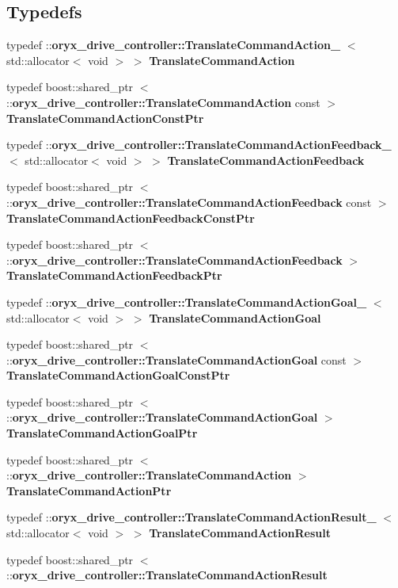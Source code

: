 \subsection*{\-Typedefs}
\begin{DoxyCompactItemize}
\item 
typedef \*
\-::{\bf oryx\-\_\-drive\-\_\-controller\-::\-Translate\-Command\-Action\-\_\-}\*
$<$ std\-::allocator$<$ void $>$ $>$ {\bf \-Translate\-Command\-Action}
\item 
typedef boost\-::shared\-\_\-ptr\*
$<$ \-::{\bf oryx\-\_\-drive\-\_\-controller\-::\-Translate\-Command\-Action} \*
const  $>$ {\bf \-Translate\-Command\-Action\-Const\-Ptr}
\item 
typedef \*
\-::{\bf oryx\-\_\-drive\-\_\-controller\-::\-Translate\-Command\-Action\-Feedback\-\_\-}\*
$<$ std\-::allocator$<$ void $>$ $>$ {\bf \-Translate\-Command\-Action\-Feedback}
\item 
typedef boost\-::shared\-\_\-ptr\*
$<$ \-::{\bf oryx\-\_\-drive\-\_\-controller\-::\-Translate\-Command\-Action\-Feedback} \*
const  $>$ {\bf \-Translate\-Command\-Action\-Feedback\-Const\-Ptr}
\item 
typedef boost\-::shared\-\_\-ptr\*
$<$ \-::{\bf oryx\-\_\-drive\-\_\-controller\-::\-Translate\-Command\-Action\-Feedback} $>$ {\bf \-Translate\-Command\-Action\-Feedback\-Ptr}
\item 
typedef \*
\-::{\bf oryx\-\_\-drive\-\_\-controller\-::\-Translate\-Command\-Action\-Goal\-\_\-}\*
$<$ std\-::allocator$<$ void $>$ $>$ {\bf \-Translate\-Command\-Action\-Goal}
\item 
typedef boost\-::shared\-\_\-ptr\*
$<$ \-::{\bf oryx\-\_\-drive\-\_\-controller\-::\-Translate\-Command\-Action\-Goal} \*
const  $>$ {\bf \-Translate\-Command\-Action\-Goal\-Const\-Ptr}
\item 
typedef boost\-::shared\-\_\-ptr\*
$<$ \-::{\bf oryx\-\_\-drive\-\_\-controller\-::\-Translate\-Command\-Action\-Goal} $>$ {\bf \-Translate\-Command\-Action\-Goal\-Ptr}
\item 
typedef boost\-::shared\-\_\-ptr\*
$<$ \-::{\bf oryx\-\_\-drive\-\_\-controller\-::\-Translate\-Command\-Action} $>$ {\bf \-Translate\-Command\-Action\-Ptr}
\item 
typedef \*
\-::{\bf oryx\-\_\-drive\-\_\-controller\-::\-Translate\-Command\-Action\-Result\-\_\-}\*
$<$ std\-::allocator$<$ void $>$ $>$ {\bf \-Translate\-Command\-Action\-Result}
\item 
typedef boost\-::shared\-\_\-ptr\*
$<$ \-::{\bf oryx\-\_\-drive\-\_\-controller\-::\-Translate\-Command\-Action\-Result} \*

\end{DoxyCompactItemize}
